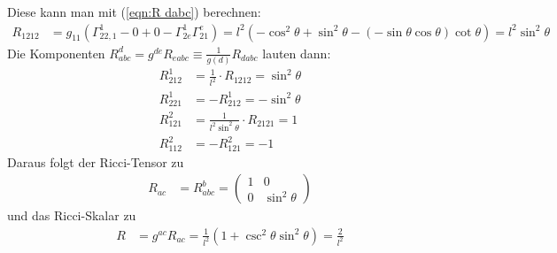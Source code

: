 \documentclass[a4paper,12pt]{article}
\newcommand{\kla}{}
\begin{document}
Diese kann man mit (\ref{eqn:R dabc}) berechnen:
\begin{align*}
R_{1212}&=g_{11}\kla\left( {\Gamma^1_{22,1}-0+0-\Gamma^1_{2e}\Gamma^e_{21}} \right)=l^2\kla\left( {-\cos^2\theta+\sin^2\theta-(-\sin\theta\cos\theta)\cot\theta} \right)=l^2\sin^2\theta
\end{align*}
Die Komponenten $R^d_{abc}=g^{de}R_{eabc}\equiv\frac{1}{g(d)}R_{dabc}$ lauten dann:
\begin{align*}
R^1_{212}&=\frac{1}{l^2}\cdot R_{1212}=\sin^2\theta\\
R^1_{221}&=-R^1_{212}=-\sin^2\theta\\
R^2_{121}&=\frac{1}{l^2\sin^2\theta}\cdot R_{2121}=1\\
R^2_{112}&=-R^2_{121}=-1
\end{align*}
Daraus folgt der Ricci-Tensor zu
\begin{align*}
R_{ac}&=R^b_{abc}=\begin{pmatrix}
1&0 \\ 0&\sin^2\theta
\end{pmatrix}
\end{align*}
und das Ricci-Skalar zu
\begin{align*}
R&=g^{ac}R_{ac}=\frac{1}{l^2}\kla\left( {1+\csc^2\theta\sin^2\theta} \right)=\frac{2}{l^2}
\end{align*}\newpage
\end{document}
